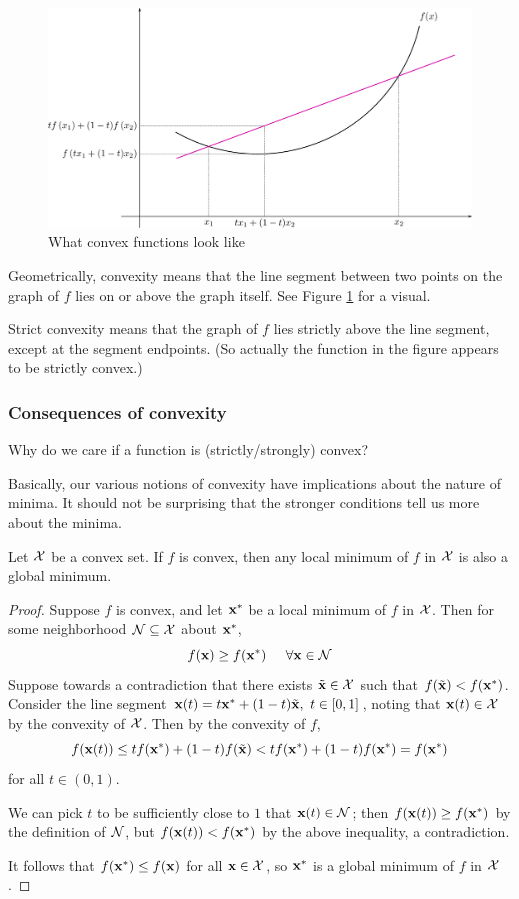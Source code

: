 \begin{figure}
  \centering
  \includegraphics[width=\linewidth]{convex-function}
  \caption{What convex functions look like}
  \label{fig:convexfunction}
\end{figure}

Geometrically, convexity means that the line segment between two points on the graph of $f$ lies on or above the graph itself.
See Figure \ref{fig:convexfunction} for a visual.

Strict convexity means that the graph of $f$ lies strictly above the line segment, except at the segment endpoints.
(So actually the function in the figure appears to be strictly convex.)

\subsubsection{Consequences of convexity}
Why do we care if a function is (strictly/strongly) convex?

Basically, our various notions of convexity have implications about the nature of minima.
It should not be surprising that the stronger conditions tell us more about the minima.

\begin{proposition}
Let $\mathcal{X}$ be a convex set.
If $f$ is convex, then any local minimum of $f$ in $\mathcal{X}$ is also a global minimum.
\end{proposition}
\begin{proof}
Suppose $f$ is convex, and let $\mathbf{x}^*$ be a local minimum of $f$ in $\mathcal{X}$.
Then for some neighborhood $\mathcal{N} \subseteq \mathcal{X}$ about $\mathbf{x}^*$,
\[f(\mathbf{x}) \geq f(\mathbf{x}^*) \hspace{0.5cm} \forall \mathbf{x} \in \mathcal{N}\]
Suppose towards a contradiction that there exists $\tilde{\mathbf{x}} \in \mathcal{X}$ such that $f(\tilde{\mathbf{x}}) < f(\mathbf{x}^*)$.
Consider the line segment $\mathbf{x}(t) = t\mathbf{x}^* + (1-t)\tilde{\mathbf{x}}, ~ t \in [0,1]$, noting that $\mathbf{x}(t) \in \mathcal{X}$ by the convexity of $\mathcal{X}$.
Then by the convexity of $f$,
\[f(\mathbf{x}(t)) \leq tf(\mathbf{x}^*) + (1-t)f(\tilde{\mathbf{x}}) < tf(\mathbf{x}^*) + (1-t)f(\mathbf{x}^*) = f(\mathbf{x}^*)\]
for all $t \in (0,1)$.

We can pick $t$ to be sufficiently close to $1$ that $\mathbf{x}(t) \in \mathcal{N}$; then $f(\mathbf{x}(t)) \geq f(\mathbf{x}^*)$ by the definition of $\mathcal{N}$, but $f(\mathbf{x}(t)) < f(\mathbf{x}^*)$ by the above inequality, a contradiction.

It follows that $f(\mathbf{x}^*) \leq f(\mathbf{x})$ for all $\mathbf{x} \in \mathcal{X}$, so $\mathbf{x}^*$ is a global minimum of $f$ in $\mathcal{X}$.
\end{proof}


